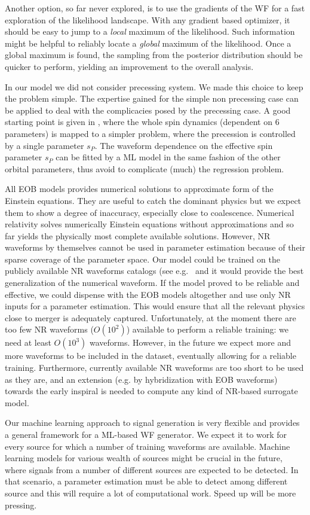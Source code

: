 Another option, so far never explored, is to use the gradients of the WF for a fast exploration of the likelihood landscape. With any gradient based optimizer, it should be easy to jump to a \textit{local} maximum of the likelihood. Such information might be helpful to reliably locate a \textit{global} maximum of the likelihood. Once a global maximum is found, the sampling from the posterior distribution should be quicker to perform, yielding an improvement to the overall analysis.
\par
In our model we did not consider precessing system. We made this choice to keep the problem simple.
The expertise gained for the simple non precessing case can be applied to deal with the complicacies posed by the precessing case.
A good starting point is given in \cite{Schmidt2015Precession}, where the whole spin dynamics (dependent on 6 parameters) is mapped to a simpler problem, where the precession is controlled by a single parameter $s_P$.
The waveform dependence on the effective spin parameter $s_P$ can be fitted by a ML model in the same fashion of 
the other orbital parameters, thus avoid to complicate (much) the regression problem.

All EOB models provides numerical solutions to approximate form of the Einstein equations. They are useful to catch 
the dominant physics but we expect them to show a degree of inaccuracy, especially close to coalescence.
Numerical relativity solves numerically Einstein equations without approximations and so far yields the physically most 
complete available solutions. However, NR waveforms by themselves cannot be used in parameter estimation because
of their sparse coverage of the parameter space. Our model could be trained on the publicly available NR waveforms 
catalogs (see e.g.~\cite{Mroue:2013xna,Boyle:2019kee,Healy:2019jyf} and it would provide the best generalization of 
the numerical waveform. If the model proved to be reliable and effective,  we could dispense with the EOB models 
altogether and use only NR inputs for a parameter estimation.  This would ensure that all the relevant physics close 
to merger is adequately captured. 
Unfortunately, at the moment there are too few NR waveforms ($O(10^2)$) available to perform a reliable 
training: we need at least $O(10^3)$ waveforms. However, in the future we expect more and more waveforms 
to be included in the dataset, eventually allowing for a reliable training. Furthermore, currently available 
NR waveforms are too short to be used as they are, and an extension (e.g. by hybridization with EOB waveforms)
towards the early inspiral is needed to compute any kind of NR-based surrogate model.

Our machine learning approach to signal generation is very flexible and provides a general framework 
for a ML-based WF generator. We expect it to work for every source for which a number of training 
waveforms are available. Machine learning models for various wealth of sources might be crucial in 
the future, where signals from a number of different sources are expected to be detected. In that scenario, 
a parameter estimation must be able to detect among different source and this will require a lot 
of computational work. Speed up will be more pressing.




